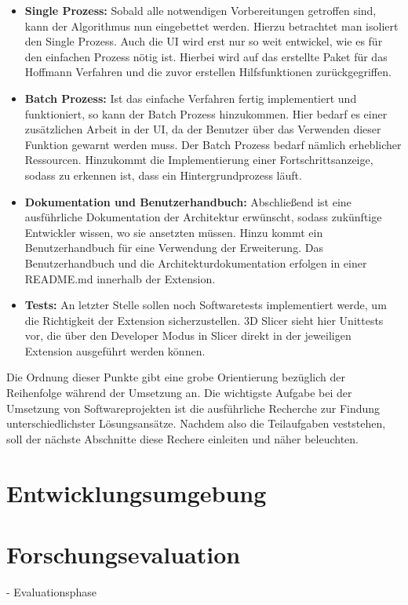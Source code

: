 \begin{itemize}
	\item \textbf{Single Prozess:} Sobald alle notwendigen Vorbereitungen
		getroffen sind, kann der Algorithmus nun eingebettet werden. Hierzu
		betrachtet man isoliert den Single Prozess. Auch die UI wird erst nur so weit
		entwickel, wie es für den einfachen Prozess nötig ist. Hierbei wird auf das erstellte
		Paket für das Hoffmann Verfahren und die zuvor erstellen Hilfsfunktionen zurückgegriffen.

	\item \textbf{Batch Prozess:} Ist das einfache Verfahren fertig implementiert
		und funktioniert, so kann der Batch Prozess hinzukommen. Hier bedarf es
		einer zusätzlichen Arbeit in der UI, da der Benutzer über das Verwenden dieser
		Funktion gewarnt werden muss. Der Batch Prozess bedarf nämlich erheblicher
		Ressourcen. Hinzukommt die Implementierung einer Fortschrittsanzeige, sodass
		zu erkennen ist, dass ein Hintergrundprozess läuft.

	\item \textbf{Dokumentation und Benutzerhandbuch:} Abschließend ist eine
		ausführliche Dokumentation der Architektur erwünscht, sodass zukünftige Entwickler
		wissen, wo sie ansetzten müssen. Hinzu kommt ein Benutzerhandbuch für eine Verwendung
		der Erweiterung. Das Benutzerhandbuch und die Architekturdokumentation
		erfolgen in einer README.md innerhalb der Extension.

	\item \textbf{Tests:} An letzter Stelle sollen noch Softwaretests
		implementiert werde, um die Richtigkeit der Extension sicherzustellen. 3D
		Slicer sieht hier Unittests vor, die über den Developer Modus in Slicer direkt
		in der jeweiligen Extension ausgeführt werden können.
\end{itemize}

Die Ordnung dieser Punkte gibt eine grobe Orientierung bezüglich der Reihenfolge
während der Umsetzung an. Die wichtigste Aufgabe bei der Umsetzung von
Softwareprojekten ist die ausführliche Recherche zur Findung unterschiedlichster
Lösungsansätze. Nachdem also die Teilaufgaben veststehen, soll der nächste
Abschnitte diese Rechere einleiten und näher beleuchten.

\section{Entwicklungsumgebung}


\section{Forschungsevaluation}
- Evaluationsphase
